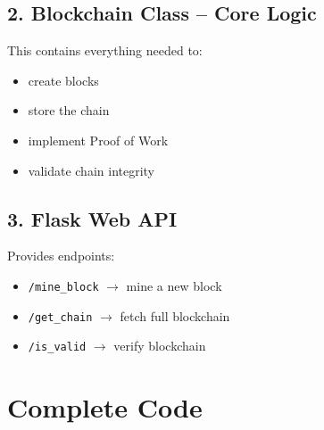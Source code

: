\documentclass[12pt,a4paper]{article}
\begin{document}
\subsection{2. Blockchain Class -- Core Logic}
This contains everything needed to:
\begin{itemize}
    \item create blocks
    \item store the chain
    \item implement Proof of Work
    \item validate chain integrity
\end{itemize}

\subsection{3. Flask Web API}
Provides endpoints:
\begin{itemize}
    \item \texttt{/mine\_block} $\rightarrow$ mine a new block
    \item \texttt{/get\_chain} $\rightarrow$ fetch full blockchain
    \item \texttt{/is\_valid} $\rightarrow$ verify blockchain
\end{itemize}

\section{Complete Code}
\end{document}
